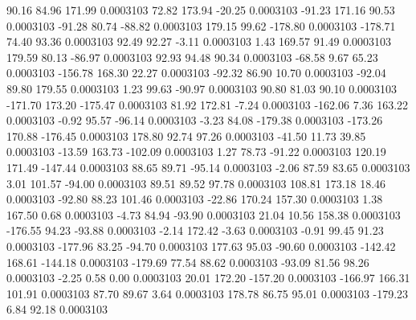        90.16       84.96      171.99     0.0003103
       72.82      173.94      -20.25     0.0003103
      -91.23      171.16       90.53     0.0003103
      -91.28       80.74      -88.82     0.0003103
      179.15       99.62     -178.80     0.0003103
     -178.71       74.40       93.36     0.0003103
       92.49       92.27       -3.11     0.0003103
        1.43      169.57       91.49     0.0003103
      179.59       80.13      -86.97     0.0003103
       92.93       94.48       90.34     0.0003103
      -68.58        9.67       65.23     0.0003103
     -156.78      168.30       22.27     0.0003103
      -92.32       86.90       10.70     0.0003103
      -92.04       89.80      179.55     0.0003103
        1.23       99.63      -90.97     0.0003103
       90.80       81.03       90.10     0.0003103
     -171.70      173.20     -175.47     0.0003103
       81.92      172.81       -7.24     0.0003103
     -162.06        7.36      163.22     0.0003103
       -0.92       95.57      -96.14     0.0003103
       -3.23       84.08     -179.38     0.0003103
     -173.26      170.88     -176.45     0.0003103
      178.80       92.74       97.26     0.0003103
      -41.50       11.73       39.85     0.0003103
      -13.59      163.73     -102.09     0.0003103
        1.27       78.73      -91.22     0.0003103
      120.19      171.49     -147.44     0.0003103
       88.65       89.71      -95.14     0.0003103
       -2.06       87.59       83.65     0.0003103
        3.01      101.57      -94.00     0.0003103
       89.51       89.52       97.78     0.0003103
      108.81      173.18       18.46     0.0003103
      -92.80       88.23      101.46     0.0003103
      -22.86      170.24      157.30     0.0003103
        1.38      167.50        0.68     0.0003103
       -4.73       84.94      -93.90     0.0003103
       21.04       10.56      158.38     0.0003103
     -176.55       94.23      -93.88     0.0003103
       -2.14      172.42       -3.63     0.0003103
       -0.91       99.45       91.23     0.0003103
     -177.96       83.25      -94.70     0.0003103
      177.63       95.03      -90.60     0.0003103
     -142.42      168.61     -144.18     0.0003103
     -179.69       77.54       88.62     0.0003103
      -93.09       81.56       98.26     0.0003103
       -2.25        0.58        0.00     0.0003103
       20.01      172.20     -157.20     0.0003103
     -166.97      166.31      101.91     0.0003103
       87.70       89.67        3.64     0.0003103
      178.78       86.75       95.01     0.0003103
     -179.23        6.84       92.18     0.0003103
